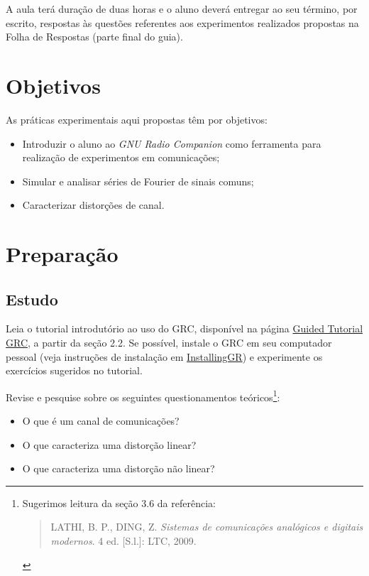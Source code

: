 \documentclass[12pt,addpoints]{exam}
\begin{document}
A aula terá duração de duas horas e o aluno deverá entregar ao seu término, por escrito, respostas às questões referentes aos experimentos realizados propostas na Folha de Respostas (parte final do guia).

\section{Objetivos}

As práticas experimentais aqui propostas têm por objetivos:
\begin{itemize}
    \item Introduzir o aluno ao \textit{GNU Radio Companion} como ferramenta para realização de experimentos em comunicações;
    \item Simular e analisar séries de Fourier de sinais comuns;
    \item Caracterizar distorções de canal.
\end{itemize}

\newpage

\section{Preparação} \label{sect:Preparacao}

\subsection{Estudo}

Leia o tutorial introdutório ao uso do GRC, disponível na página \href{http://wiki.gnuradio.org/index.php/Guided_Tutorial_GRC}{Guided Tutorial GRC}, a partir da seção 2.2. Se possível, instale o GRC em seu computador pessoal (veja instruções de instalação em \href{http://wiki.gnuradio.org/index.php/InstallingGR}{InstallingGR}) e experimente os exercícios sugeridos no tutorial.

Revise e pesquise sobre os seguintes questionamentos teóricos\footnote{Sugerimos leitura da seção 3.6 da referência: \begin{quote} LATHI, B. P., DING, Z. \textit{Sistemas de comunicações analógicos e digitais modernos}. 4 ed. [S.l.]: LTC, 2009. \end{quote}}:
\begin{itemize}
    \item O que é um canal de comunicações?
    \item O que caracteriza uma distorção linear? 
    \item O que caracteriza uma distorção não linear?
\end{itemize}
\end{document}
